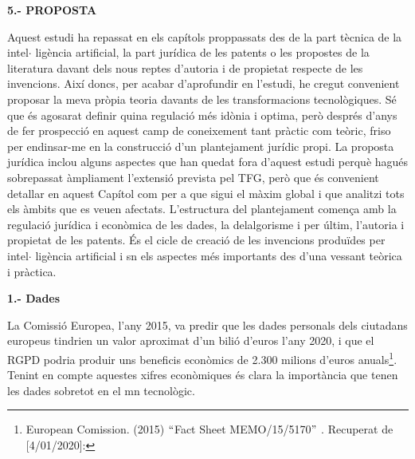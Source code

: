 \documentclass[12pt]{article}
\renewcommand{\_}{\kern-1.5pt\textunderscore\kern-1.5pt}
\begin{document}
\begin{itemize}
\vspace{\baselineskip}
\begin{justify}
\textbf{5.- PROPOSTA}
\end{justify}\par


\vspace{\baselineskip}
\begin{justify}
Aquest estudi ha repassat en els capítols proppassats des de la part tècnica de la intel$ \cdot $ ligència artificial, la part jurídica de les patents o les propostes de la literatura davant dels nous reptes d’autoria i de propietat respecte de les invencions. Així doncs, per acabar d’aprofundir en l’estudi, he cregut convenient proposar la meva pròpia teoria davants de les transformacions tecnològiques. Sé que és agosarat definir quina regulació més idònia i optima, però després d’anys de fer prospecció en aquest camp de coneixement tant pràctic com teòric, friso per endinsar-me en la construcció d’un plantejament jurídic propi. La proposta jurídica inclou alguns aspectes que han quedat fora d’aquest estudi perquè hagués sobrepassat àmpliament l’extensió prevista pel TFG, però que és convenient detallar en aquest Capítol com per a que sigui el màxim global i que analitzi tots els àmbits que es veuen afectats. L’estructura del plantejament comença amb la regulació jurídica i econòmica de les dades, la delalgorisme i per últim, l’autoria i propietat de les patents. És el cicle de creació de les invencions produïdes per intel$ \cdot $ ligència artificial i sn els aspectes més importants des d’una vessant teòrica i pràctica. 
\end{justify}\par


\vspace{\baselineskip}
\textbf{1.- Dades}\par


\vspace{\baselineskip}
\begin{justify}
La Comissió Europea, l’any 2015, va predir que les dades personals dels ciutadans europeus tindrien un valor aproximat d’un bilió d’euros l’any 2020, i que el RGPD podria produir uns beneficis econòmics de 2.300 milions d’euros anuals\footnote{ European Comission. (2015) $``$Fact Sheet MEMO/15/5170$"$ . Recuperat de [4/01/2020]:  }. Tenint en compte aquestes xifres econòmiques és clara la importància que tenen les dades sobretot en el mn tecnològic. 
\end{justify}\par



\end{itemize}
\end{document}
